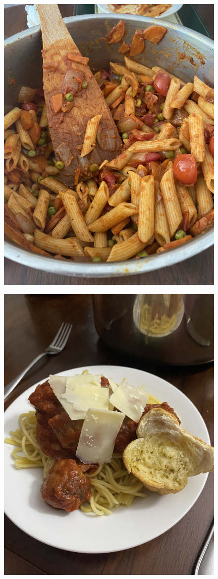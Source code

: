 \documentclass[]{article}
\begin{document}
\newpage\begin{figure}[H]
\begin{center}\hyperref[rec:Red Sauce Rigatoni]{\includegraphics[keepaspectratio,width=\textheight,height=\textwidth,angle=-90]{Gallery/Red Sauce Rigatoni}}\caption*{}\label{fig:Red Sauce Rigatoni}\end{center}
\end{figure}
\newpage\begin{figure}[H]
\begin{center}\hyperref[rec:Spaghetti And Meatballs]{\includegraphics[keepaspectratio,width=\textheight,height=\textwidth,angle=-90]{Gallery/Spaghetti And Meatballs}}\caption*{}\label{fig:Spaghetti And Meatballs}\end{center}
\end{figure}
\end{document}

